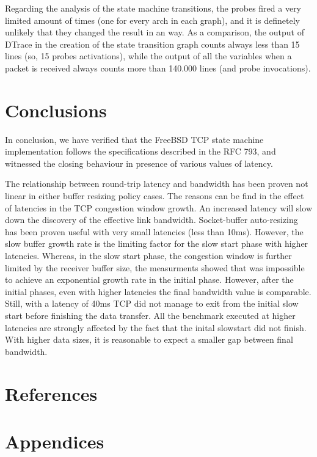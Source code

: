 \documentclass[a4paper,10pt]{article}
\begin{document}
Regarding the analysis of the state machine transitions, the probes fired a very limited amount of times (one for every arch in each graph), and it is definetely unlikely that they changed the result in an way. As a comparison, the output of DTrace in the creation of the state transition graph counts always less than 15 lines (so, 15 probes activations), while the output of all the variables when a packet is received always counts more than 140.000 lines (and probe invocations).


\section{Conclusions}

In conclusion, we have verified that the FreeBSD TCP state machine implementation follows the specifications described in the RFC 793\cite{postel_transmission_nodate}, and witnessed the closing behaviour in presence of various values of latency.

The relationship between round-trip latency and bandwidth has been proven not linear in either buffer resizing policy cases. The reasons can be find in the effect of latencies in the TCP congestion window growth. An increased latency will slow down the discovery of the effective link bandwidth. 
Socket-buffer auto-resizing has been proven useful with very small latencies (less than 10ms). However, the slow buffer growth rate is the limiting factor for the slow start phase with higher latencies. 
Whereas, in the slow start phase, the congestion window is further limited by the receiver buffer size, the measurments showed that was impossible to achieve an exponential growth rate in the initial phase. However, after the initial phases, even with higher latencies the final bandwidth value is comparable. 
Still, with a latency of 40ms TCP did not manage to exit from the initial slow start before finishing the data transfer. 
All the benchmark executed at higher latencies are strongly affected by the fact that the inital slowstart did not finish. With higher data sizes, it is reasonable to expect a smaller gap between final bandwidth. 

\newpage

\section{References}

\printbibliography

\section{Appendices}
\end{document}
